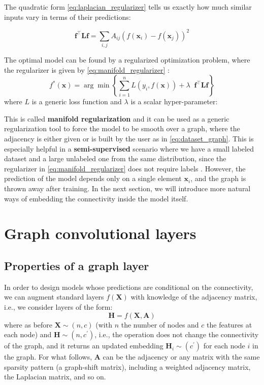 The quadratic form \eqref{eq:laplacian_regularizer} tells us exactly how much similar inputs vary in terms of their predictions:

\begin{equation}
\mathbf{f}^\top\mathbf{L}\mathbf{f} = \sum_{i,j} A_{ij}(f(\mathbf{x}_i)-f(\mathbf{x}_j))^2
\label{eq:manifold_regularizer}
\end{equation}

The optimal model can be found by a regularized optimization problem, where the regularizer is given by \eqref{eq:manifold_regularizer} :
%
$$
f^*(\mathbf{x})=\arg\min \left\{\sum_{i=1}^nL(y_i, f(\mathbf{x}))  + \lambda \;\;\mathbf{f}^\top \mathbf{L}\mathbf{f}\right\}
$$
%
where $L$ is a generic loss function and $\lambda$ is a scalar hyper-parameter:

This is called \textbf{manifold regularization} \cite{belkin2006manifold} and it can be used as a generic regularization tool to force the model to be smooth over a graph, where the adjacency is either given or is built by the user as in \eqref{eq:dataset_graph}. This is especially helpful in a \textbf{semi-supervised} scenario where we have a small labeled dataset and a large unlabeled one from the same distribution, since the regularizer in \eqref{eq:manifold_regularizer} does not require labels \cite{belkin2006manifold}. However, the prediction of the model depends only on a single element $\mathbf{x}_i$, and the graph is thrown away after training. In the next section, we will introduce more natural ways of embedding the connectivity inside the model itself.

\section{Graph convolutional layers}
\subsection{Properties of a graph layer}

In order to design models whose predictions are conditional on the connectivity, we can augment standard layers $f(\mathbf{X})$ with knowledge of the adjacency matrix, i.e., we consider layers of the form:
%
$$
\mathbf{H} =f(\mathbf{X}, \mathbf{A})
$$
%
where as before $\mathbf{X} \sim (n, c)$ (with $n$ the number of nodes and $c$ the features at each node) and $\mathbf{H} \sim (n, c^\prime)$, i.e., the operation does not change the connectivity of the graph, and it returns an updated embedding $\mathbf{H}_i \sim (c^\prime)$ for each node $i$ in the graph. For what follows, $\mathbf{A}$ can be the adjacency or any matrix with the same sparsity pattern (a graph-shift matrix), including a weighted adjacency matrix, the Laplacian matrix, and so on.

